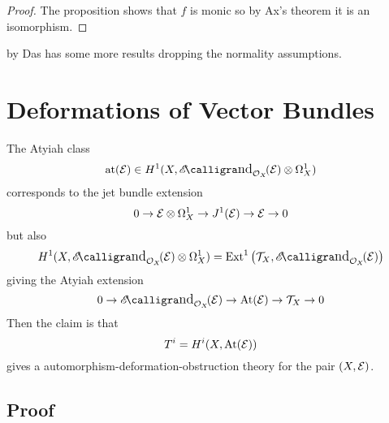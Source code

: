 \documentclass[12pt]{article}
\begin{document}
\begin{proof}
The proposition shows that $f$ is monic so by Ax's theorem it is an isomorphism.
\end{proof}

 by Das has some more results dropping the normality assumptions.

\section{Deformations of Vector Bundles}

\newcommand{\at}{\mathrm{at}}
\newcommand{\At}{\mathrm{At}}

The Atyiah class
\[ \at(\E) \in H^1(X, \shEnd{\struct{X}}{\E} \ot \Omega_X^1) \]
corresponds to the jet bundle extension
\[ 0 \to \mathcal{E} \otimes \Omega_X^1 \to J^1(\mathcal{E}) \to \mathcal{E} \to 0 \]
but also 
\[ H^1(X, \shEnd{\struct{X}}{\E} \ot \Omega_X^1) = \Ext{1}{}{\T_X}{\shEnd{\struct{X}}{\E}} \]
giving the Atyiah extension
\[ 0 \to \shEnd{\struct{X}}{\E} \to \At(\E) \to \T_X \to 0 \]
Then the claim is that 
\[ T^i = H^i(X, \At(\E)) \]
gives a automorphism-deformation-obstruction theory for the pair $(X, \mathcal{E})$. 

\subsection{Proof}
\end{document}
